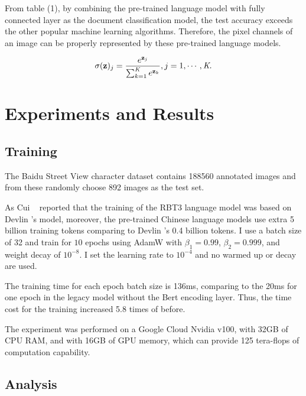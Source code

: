 \documentclass[review]{cvpr}
\begin{document}
\par From table (1), by combining the pre-trained language model with fully connected layer as the document classification model,
the test accuracy exceeds the other popular machine learning algorithms.
Therefore, the pixel channels of an image can be properly represented by these pre-trained language models.


\begin{equation}
  \sigma(\textbf{z})_j = {e^{\textbf{z}_j} \over {\sum_{k=1}^{\textit{K}} e^{\textbf{z}_k}}}, j=1,\cdots,\textit{K}.
\end{equation}



\section{Experiments and Results}


\subsection{Training}

The Baidu Street View character dataset contains 188560 annotated images and from these randomly choose 892 images as the test set.

As Cui \etal~\cite{cui2020revisiting} reported that the training of the RBT3 language model was based on Devlin \etal's model,
moreover, the pre-trained Chinese language models use extra 5 billion training tokens comparing to Devlin \etal's 0.4 billion tokens.
I use a batch size of 32 and train for $10$ epochs using AdamW with $\beta_1=0.99$, $\beta_2=0.999$, and weight decay of $10^{-8}$.
I set the learning rate to $10^{-4}$ and no warmed up or decay are used.

\par The training time for each epoch batch size is 136ms, comparing to the 20ms for one epoch in the legacy model without the Bert encoding layer.
Thus, the time cost for the training increased 5.8 times of before.

\par The experiment was performed on a Google Cloud Nvidia v100, with 32GB of CPU RAM, and with 16GB of GPU memory,
which can provide 125 tera-flops of computation capability.

\subsection{Analysis}
\end{document}
